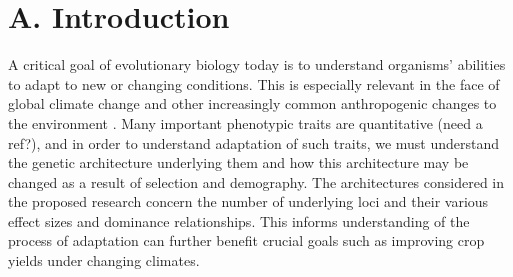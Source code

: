 






\section*{A. Introduction}	%

A critical goal of evolutionary biology today is to understand organisms' abilities to adapt to new or changing conditions. This is especially relevant in the face of global climate change and other increasingly common anthropogenic changes to the environment \citep{Easterling:2000ja}. Many important phenotypic traits are quantitative (need a ref?), and in order to understand adaptation of such traits, we must understand the genetic architecture underlying them and how this architecture may be changed as a result of selection and demography. The architectures considered in the proposed research concern the number of underlying loci and their various effect sizes and dominance relationships. This informs understanding of the process of adaptation can further benefit crucial goals such as improving crop yields under changing climates.

